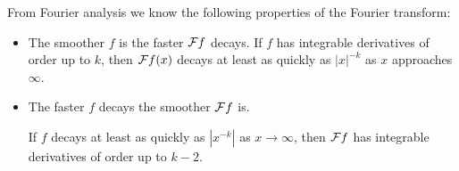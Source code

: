     From Fourier analysis we know the following properties of the Fourier transform: 
    \begin{itemize}
      \item The smoother $f$ is the faster $\mathcal{F} f$ decays.
        If $f$ has integrable derivatives of order up to $k$, then $\mathcal{F} f(x)$ decays at least as quickly as $|x|^{-k}$ as $x$ approaches $\infty$.
      \item The faster $f$ decays the smoother $\mathcal{F} f$ is.

        If $f$ decays at least as quickly as $|x^{-k}|$ as $x\rightarrow\infty$, then $\mathcal{F} f$ has integrable derivatives of order up to $k-2$. %
    \end{itemize}

%

